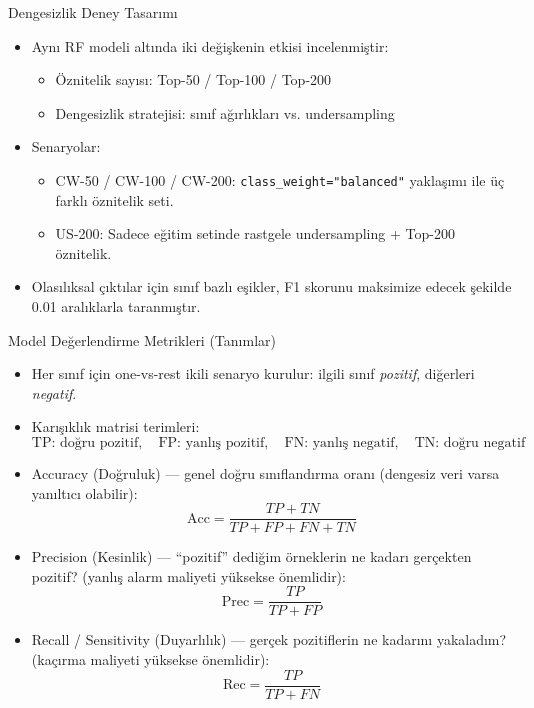 \documentclass[aspectratio=169]{beamer}
\def\textbf#1{#1}%
\begin{document}
\begin{frame}{Dengesizlik Deney Tasarımı}
	\begin{itemize}
		\item Aynı RF modeli altında iki değişkenin etkisi incelenmiştir:
		\begin{itemize}
			\item Öznitelik sayısı: Top-50 / Top-100 / Top-200
			\item Dengesizlik stratejisi: sınıf ağırlıkları vs. undersampling
		\end{itemize}
		\item Senaryolar:
		\begin{itemize}
			\item \textbf{CW-50 / CW-100 / CW-200}: \texttt{class\_weight="balanced"} yaklaşımı \cite{he2009-imbalanced-data} ile üç farklı öznitelik seti.
			\item \textbf{US-200}: Sadece eğitim setinde rastgele undersampling \cite{liu2008-exploratory-undersampling} + Top-200 öznitelik.
		\end{itemize}
		\item Olasılıksal çıktılar için sınıf bazlı eşikler, F1 skorunu maksimize edecek şekilde 0.01 aralıklarla taranmıştır.
	\end{itemize}
\end{frame}
\begin{frame}{Model Değerlendirme Metrikleri (Tanımlar)}
	\small
	\begin{itemize}
		\item Her sınıf için one-vs-rest ikili senaryo kurulur: ilgili sınıf \emph{pozitif}, diğerleri \emph{negatif}.
		\item Karışıklık matrisi terimleri:
		\[
		\text{TP: doğru pozitif},\quad \text{FP: yanlış pozitif},\quad
		\text{FN: yanlış negatif},\quad \text{TN: doğru negatif}
		\]
		\item \textbf{Accuracy (Doğruluk)} — genel doğru sınıflandırma oranı (dengesiz veri varsa yanıltıcı olabilir):
		\[
		\text{Acc}=\frac{TP+TN}{TP+FP+FN+TN}
		\]
		\item \textbf{Precision (Kesinlik)} — “pozitif” dediğim örneklerin ne kadarı gerçekten pozitif? (yanlış alarm maliyeti yüksekse önemlidir):
		\[
		\text{Prec}=\frac{TP}{TP+FP}
		\]
		\item \textbf{Recall / Sensitivity (Duyarlılık)} — gerçek pozitiflerin ne kadarını yakaladım? (kaçırma maliyeti yüksekse önemlidir):
		\[
		\text{Rec}=\frac{TP}{TP+FN}
		\]
		
	\end{itemize}
\end{frame}
\end{document}

